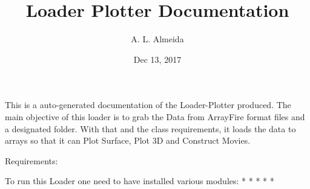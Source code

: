 \documentclass[letterpaper,10pt,english]{sphinxmanual}
\title{Loader Plotter Documentation}
\date{Dec 13, 2017}
\author{A. L. Almeida}
\begin{document}
\maketitle


This is a auto-generated documentation of the Loader-Plotter produced.
The main objective of this loader is to grab the Data from ArrayFire format files and a designated folder. With that and the class requirements, it loads the data to  arrays so that it can Plot Surface, Plot 3D and Construct Movies.

Requirements:

To run this Loader one need to have installed various modules:
* 
* 
* 
* 
* 
\end{document}
